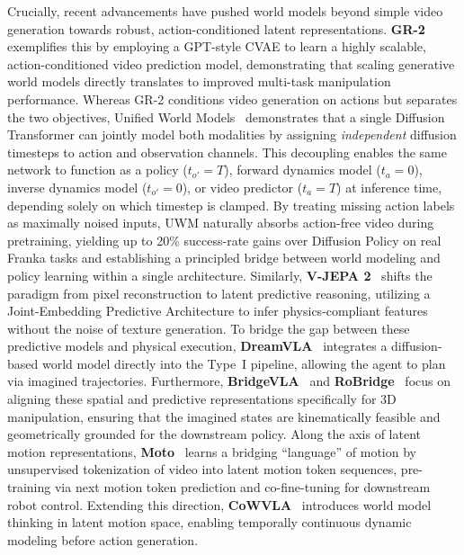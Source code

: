 \documentclass[acmsmall,screen,review,anonymous]{acmart}
\begin{document}
Crucially, recent advancements have pushed world models beyond simple video generation towards robust, action-conditioned latent representations. \textbf{GR-2}~\cite{cheang2024gr2} exemplifies this by employing a GPT-style CVAE to learn a highly scalable, action-conditioned video prediction model, demonstrating that scaling generative world models directly translates to improved multi-task manipulation performance. Whereas GR-2 conditions video generation on actions but separates the two objectives, Unified World Models~\cite{zhu2025uwm} demonstrates that a single Diffusion Transformer can jointly model both modalities by assigning \emph{independent} diffusion timesteps to action and observation channels. This decoupling enables the same network to function as a policy ($t_{o'}\!=\!T$), forward dynamics model ($t_a\!=\!0$), inverse dynamics model ($t_{o'}\!=\!0$), or video predictor ($t_a\!=\!T$) at inference time, depending solely on which timestep is clamped. By treating missing action labels as maximally noised inputs, UWM naturally absorbs action-free video during pretraining, yielding up to 20\% success-rate gains over Diffusion Policy on real Franka tasks and establishing a principled bridge between world modeling and policy learning within a single architecture. Similarly, \textbf{V-JEPA 2}~\cite{assran2025vjepa} shifts the paradigm from pixel reconstruction to latent predictive reasoning, utilizing a Joint-Embedding Predictive Architecture to infer physics-compliant features without the noise of texture generation. To bridge the gap between these predictive models and physical execution, \textbf{DreamVLA}~\cite{zhang2025dreamvla} integrates a diffusion-based world model directly into the Type~I pipeline, allowing the agent to plan via imagined trajectories. Furthermore, \textbf{BridgeVLA}~\cite{li2025bridgevla} and \textbf{RoBridge}~\cite{zhang2025robridge} focus on aligning these spatial and predictive representations specifically for 3D manipulation, ensuring that the imagined states are kinematically feasible and geometrically grounded for the downstream policy. Along the axis of latent motion representations, \textbf{Moto}~\cite{chen2025moto} learns a bridging ``language'' of motion by unsupervised tokenization of video into latent motion token sequences, pre-training via next motion token prediction and co-fine-tuning for downstream robot control. Extending this direction, \textbf{CoWVLA}~\cite{yang2026chainofworld} introduces world model thinking in latent motion space, enabling temporally continuous dynamic modeling before action generation.
\end{document}
